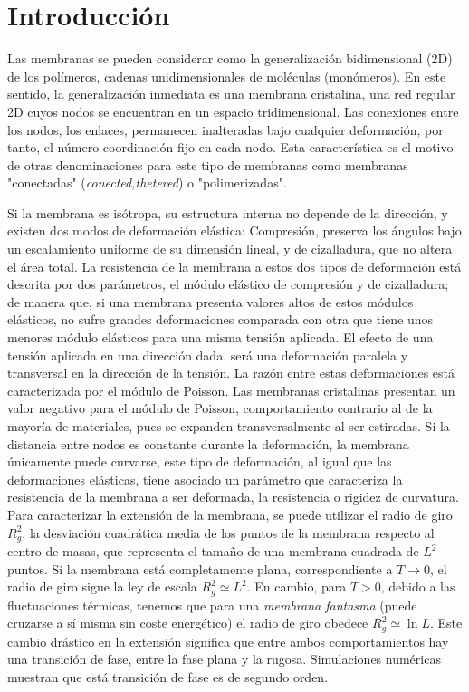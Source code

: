\chapter{Introducción}

Las membranas se pueden considerar como la generalización bidimensional (2D)
de los polímeros, cadenas unidimensionales de moléculas (monómeros). En este
sentido, la generalización inmediata es una membrana cristalina, una
red regular 2D cuyos nodos se encuentran en un espacio tridimensional. Las conexiones
entre los nodos, los enlaces, permanecen inalteradas
 bajo cualquier deformación, por tanto, el número coordinación fijo en cada
 nodo. Esta característica es el motivo de otras denominaciones para este tipo
 de membranas como membranas "conectadas" (\textit{conected,thetered}) o "polimerizadas".  

Si la membrana es isótropa, su estructura interna no depende de la dirección,
y existen dos modos de deformación elástica: Compresión, preserva
los ángulos bajo un escalamiento uniforme de su dimensión lineal, y de
cizalladura, que no altera el área total. La resistencia de la membrana a
estos dos tipos de deformación está descrita por dos parámetros, el módulo
elástico de compresión y de cizalladura; de manera que, si una membrana
presenta valores altos de estos módulos elásticos, no sufre grandes
deformaciones comparada con otra que tiene unos menores módulo elásticos para
una misma tensión aplicada. El efecto de una tensión aplicada en una
dirección dada, será una deformación paralela y transversal en la dirección de
la tensión. La razón entre estas deformaciones está caracterizada por el
módulo de Poisson. Las membranas cristalinas presentan un valor
negativo para el módulo de Poisson, comportamiento contrario al de la mayoría
de materiales, pues se expanden transversalmente al ser estiradas. 
Si la distancia entre nodos es constante durante la deformación, la membrana
únicamente puede curvarse, este tipo de deformación, al igual que las
deformaciones elásticas, tiene asociado un parámetro que caracteriza la
resistencia de la membrana a ser deformada, la resistencia o rigidez de
curvatura. Para caracterizar la extensión de la membrana, se puede utilizar el
radio de giro $R^2_g$, la desviación cuadrática media de los puntos de la
membrana respecto al centro de masas, que representa el tamaño de una membrana cuadrada
de $L^2$ puntos. Si la membrana está completamente plana, correspondiente a
$T\rightarrow 0$, el radio de giro sigue la ley de escala $R^2_g\simeq L^2$. En cambio,
para $T>0$, debido a las fluctuaciones térmicas, tenemos que para una \textit{membrana
fantasma} (puede cruzarse a sí misma sin coste energético) el radio de giro
obedece $R^2_g\simeq \ln L$. Este cambio drástico en la extensión significa
que entre ambos comportamientos hay una transición de fase, entre la fase
plana y la rugosa. Simulaciones numéricas muestran que está transición de fase
es de segundo orden.

